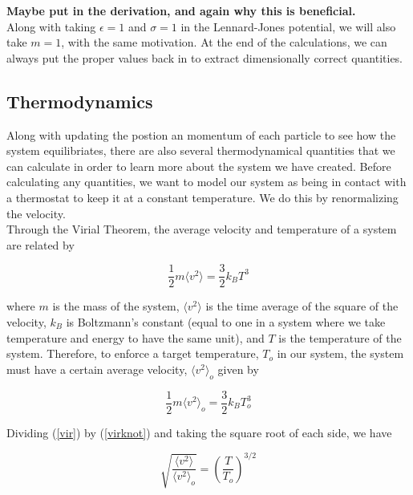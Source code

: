 \documentclass{article}
\begin{document}
\begin{multicols}{2}
\textbf{Maybe put in the derivation, and again why this is beneficial.}\\

Along with taking $\epsilon =1$ and $\sigma =1$ in the Lennard-Jones potential, we will also take $m=1$, with the same motivation.  At the end of the calculations, we can always put the proper values back in to extract dimensionally correct quantities.  

\subsection{Thermodynamics}

Along with updating the postion an momentum of each particle to see how the system equilibriates, there are also several thermodynamical quantities that we can calculate in order to learn more about the system we have created.  Before calculating any quantities, we want to model our system as being in contact with a thermostat to keep it at a constant temperature.  We do this by renormalizing the velocity.  \\

Through the Virial Theorem, the average velocity and temperature of a system are related by

\begin{equation}
\label{vir}
\frac{1}{2}m \langle v^2 \rangle = \frac{3}{2} k_B T^3
\end{equation}

\noindent where $m$ is the mass of the system, $\langle v^2 \rangle$ is the time average of the square of the velocity, $k_B$ is Boltzmann's constant (equal to one in a system where we take temperature and energy to have the same unit), and $T$ is the temperature of the system.  Therefore, to enforce a target temperature, $T_o$ in our system, the system must have a certain average velocity, $\langle v^2 \rangle _o$ given by

\begin{equation}
\label{virknot}
\frac{1}{2}m \langle v^2 \rangle _o = \frac{3}{2} k_B T_o^3
\end{equation}

Dividing (\ref{vir}) by (\ref{virknot}) and taking the square root of each side, we have

\begin{equation}
\sqrt{\frac{\langle v^2 \rangle}{\langle v^2 \rangle _o}} = \left ( \frac{T}{T_o} \right ) ^{3/2}
\end{equation}


\end{multicols}
\end{document}
